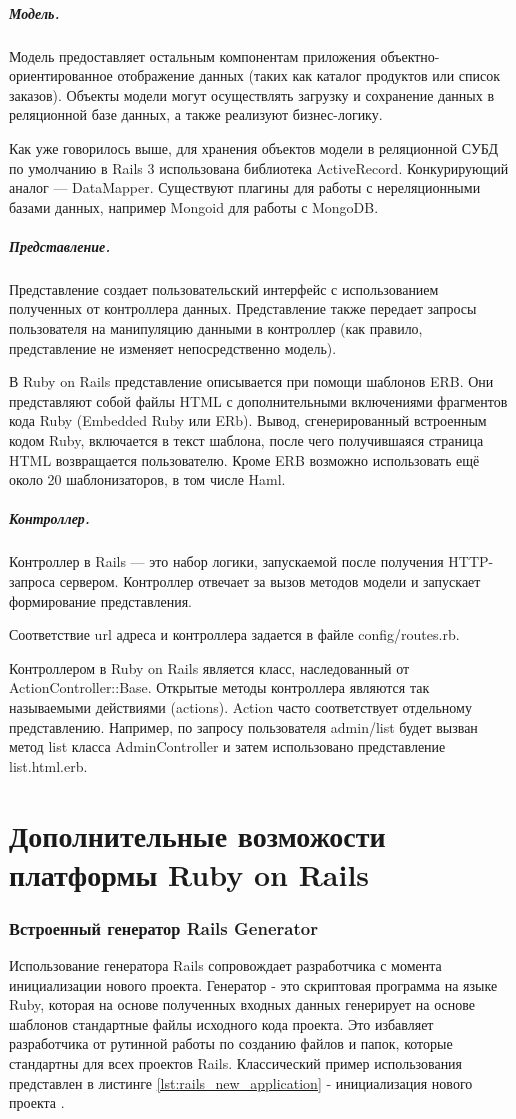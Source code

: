\subparagraph{Модель.} 
Модель предоставляет остальным компонентам приложения объектно-ориентированное
отображение данных (таких как каталог продуктов или список заказов). Объекты
модели могут осуществлять загрузку и сохранение данных в реляционной базе
данных, а также реализуют бизнес-логику.

Как уже говорилось выше, для хранения объектов модели в реляционной СУБД по
умолчанию в Rails 3 использована библиотека ActiveRecord. Конкурирующий аналог —
DataMapper. Существуют плагины для работы с нереляционными базами данных,
например Mongoid для работы с MongoDB.

\subparagraph{Представление.}
Представление создает пользовательский интерфейс с использованием полученных от
контроллера данных. Представление также передает запросы пользователя на
манипуляцию данными в контроллер (как правило, представление не изменяет
непосредственно модель).

В Ruby on Rails представление описывается при помощи шаблонов ERB. Они
представляют собой файлы HTML с дополнительными включениями фрагментов кода Ruby
(Embedded Ruby или ERb). Вывод, сгенерированный встроенным кодом Ruby,
включается в текст шаблона, после чего получившаяся страница HTML возвращается
пользователю. Кроме ERB возможно использовать ещё около 20 шаблонизаторов, в том
числе Haml.

\subparagraph{Контроллер.}
Контроллер в Rails — это набор логики, запускаемой после получения HTTP-запроса
сервером. Контроллер отвечает за вызов методов модели и запускает формирование
представления.

Соответствие url адреса и контроллера задается в файле config/routes.rb.

Контроллером в Ruby on Rails является класс, наследованный от \\
ActionController::Base. Открытые методы контроллера являются так называемыми
действиями (actions). Action часто соответствует отдельному представлению.
Например, по запросу пользователя admin/list будет вызван метод list класса
AdminController и затем использовано представление \\ list.html.erb.

\section{Дополнительные возможости платформы Ruby on Rails}
\subsubsection{Встроенный генератор Rails Generator}
Использование генератора Rails сопровождает разработчика с момента инициализации
нового проекта. Генератор - это скриптовая программа на языке Ruby, которая на
основе полученных входных данных генерирует на основе шаблонов стандартные файлы
исходного кода проекта. Это избавляет разработчика от рутинной работы по
созданию файлов и папок, которые стандартны для всех проектов Rails.
Классический пример использования представлен в листинге
\ref{lst:rails_new_application}  - инициализация нового проекта .

